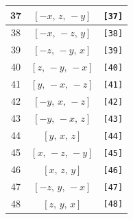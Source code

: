 \documentclass[fleqn,8pt]{jsarticle}
\begin{document}
\begin{longtable}{ccc}
37 & $\left[ - x,\, z,\, - y \right]$ & {\tt [37]} \\ \hline
38 & $\left[ - x,\, - z,\, y \right]$ & {\tt [38]} \\ \hline
39 & $\left[ - z,\, - y,\, x \right]$ & {\tt [39]} \\ \hline
40 & $\left[ z,\, - y,\, - x \right]$ & {\tt [40]} \\ \hline
41 & $\left[ y,\, - x,\, - z \right]$ & {\tt [41]} \\ \hline
42 & $\left[ - y,\, x,\, - z \right]$ & {\tt [42]} \\ \hline
43 & $\left[ - y,\, - x,\, z \right]$ & {\tt [43]} \\ \hline
44 & $\left[ y,\, x,\, z \right]$ & {\tt [44]} \\ \hline
45 & $\left[ x,\, - z,\, - y \right]$ & {\tt [45]} \\ \hline
46 & $\left[ x,\, z,\, y \right]$ & {\tt [46]} \\ \hline
47 & $\left[ - z,\, y,\, - x \right]$ & {\tt [47]} \\ \hline
48 & $\left[ z,\, y,\, x \right]$ & {\tt [48]} \\
\end{longtable}
\end{document}
